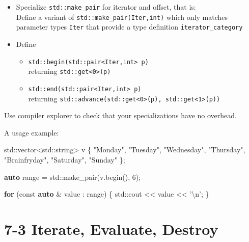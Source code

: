\documentclass[]{article}
\newenvironment{Shaded}{}{}
\newcommand{\KeywordTok}[1]{\textcolor[rgb]{0.00,0.44,0.13}{\textbf{{#1}}}}
\newcommand{\DataTypeTok}[1]{\textcolor[rgb]{0.56,0.13,0.00}{{#1}}}
\newcommand{\DecValTok}[1]{\textcolor[rgb]{0.25,0.63,0.44}{{#1}}}
\newcommand{\CharTok}[1]{\textcolor[rgb]{0.25,0.44,0.63}{{#1}}}
\newcommand{\StringTok}[1]{\textcolor[rgb]{0.25,0.44,0.63}{{#1}}}
\newcommand{\NormalTok}[1]{{#1}}
\providecommand{\tightlist}{%
  \setlength{\itemsep}{0pt}\setlength{\parskip}{0pt}}
\begin{document}
\begin{itemize}
\tightlist
\item
  Specialize \texttt{std::make\_pair} for iterator and offset, that
  is:\\
   Define a variant of \texttt{std::make\_pair(Iter,int)} which only
  matches parameter types \texttt{Iter} that provide a type definition
  \texttt{iterator\_category}
\item
  Define

  \begin{itemize}
  \tightlist
  \item
    \texttt{std::begin(std::pair\textless{}Iter,int\textgreater{}\ p)}\\
     returning \texttt{std::get\textless{}0\textgreater{}(p)}
  \item
    \texttt{std::end(std::pair\textless{}Iter,int\textgreater{}\ p)}\\
     returning
    \texttt{std::advance(std::get\textless{}0\textgreater{}(p),\ std::get\textless{}1\textgreater{}(p))}
  \end{itemize}
\end{itemize}

Use compiler explorer to check that your specializations have no
overhead.

A usage example:

\begin{Shaded}
\begin{Highlighting}[]
\NormalTok{std::vector<std::string> v \{}
   \StringTok{"Monday"}\NormalTok{, }\StringTok{"Tuesday"}\NormalTok{, }\StringTok{"Wednesday"}\NormalTok{,}
   \StringTok{"Thursday"}\NormalTok{, }\StringTok{"Brainfryday"}\NormalTok{, }\StringTok{"Saturday"}\NormalTok{, }\StringTok{"Sunday"} \NormalTok{\};}

\KeywordTok{auto} \NormalTok{range = std::make_pair(v.begin(), }\DecValTok{6}\NormalTok{);}

\KeywordTok{for} \NormalTok{(}\DataTypeTok{const} \KeywordTok{auto} \NormalTok{& value : range) \{}
   \NormalTok{std::cout << value << }\StringTok{'}\CharTok{\textbackslash{}n}\StringTok{'}\NormalTok{;}
\NormalTok{\}}
\end{Highlighting}
\end{Shaded}

\section{7-3 Iterate, Evaluate, Destroy}\label{iterate-evaluate-destroy}
\end{document}
